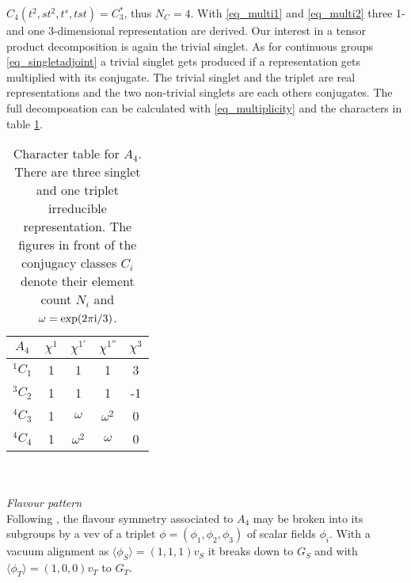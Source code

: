 $C_4(t^2,st^2,t^s,tst)=C_3^*$, thus $N_C=4$. With \eqref{eq_multi1} and \eqref{eq_multi2} three 1- and one 3-dimensional representation are derived.
Our interest in a tensor product decomposition is again the trivial singlet. As for continuous groups \eqref{eq_singletadjoint} a trivial singlet 
gets produced if a representation gets multiplied with its conjugate. The trivial singlet and the triplet are real representations and the two
non-trivial singlets are each others conjugates. The full decomposation can be calculated with \eqref{eq_multiplicity} and the characters in table
\ref{tab_charactertable}.
\begin{table}[t]
 \begin{tabular}{c|cccc}
 $A_4$ & $\chi^1$ & $\chi^{1'}$ & $\chi^{1''}$ & $\chi^3$ \\
 \hline
 $^1C_1$ & 1 & 1 & 1 & 3\\
 $^3C_2$ & 1 & 1 & 1& -1\\
 $^4C_3$ & 1 & $\omega$& $\omega^2$ & 0\\
 $^4C_4$ & 1 & $\omega^2$& $\omega$ & 0
 \end{tabular}
\caption{Character table for $A_4$. There are three singlet and one triplet irreducible representation. The figures in front of the conjugacy
classes $C_i$ denote their element count $N_i$ and $\omega=\exp(2\pi\text{i}/3)$.}
\label{tab_charactertable}
\end{table}
\\ \\ \textit{Flavour pattern}\\
\noindent Following \cite{0512103}, the flavour symmetry associated to $A_4$ may be broken into its subgroups by a vev of a triplet 
$\phi=(\phi_1,\phi_2,\phi_3)$ of scalar fields $\phi_i$. With a vacuum alignment as $\langle\phi_S\rangle = (1,1,1)v_S$ it breaks down to $G_S$
and with $\langle\phi_T\rangle=(1,0,0)v_T$ to $G_T$. 


